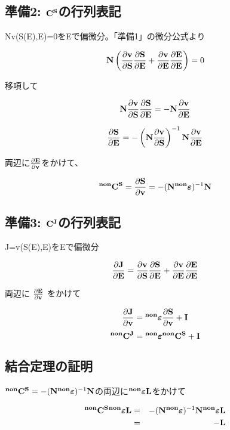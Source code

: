 \subsection{準備2: \({\bf C^S}\)の行列表記}
Nv(S(E),E)=0をEで偏微分。「準備1」の微分公式より

\[
{\bf N}\left(\frac{\partial \bf v}{\partial \bf S}\frac{\partial \bf S}{\partial \bf E}+\frac{\partial \bf v}{\partial \bf E}\frac{\partial \bf E}{\partial \bf E}\right)=0
\]

移項して

\[
{\bf N}\frac{\partial \bf v}{\partial \bf S}\frac{\partial \bf S}{\partial \bf E}=-{\bf N}\frac{\partial \bf v}{\partial \bf E}
\]

\[
\frac{\partial \bf S}{\partial \bf E}=-\left({\bf N}\frac{\partial \bf v}{\partial \bf S}\right)^{-1}{\bf N}\frac{\partial \bf v}{\partial \bf E}
\]

両辺に\(\frac{\partial \bf E}{\partial \bf v}\)をかけて、

\[
{\bf {}^{non}C^S}=\frac{\partial \bf S}{\partial \bf v}=-({\bf N {}^{non}{\boldsymbol \varepsilon}})^{-1}{\bf N}
\]

\subsection{準備3: \({\bf C^J}\)の行列表記}
J=v(S(E),E)をEで偏微分

\[\frac{\partial \bf J}{\partial \bf E}=\frac{\partial \bf v}{\partial \bf S}\frac{\partial \bf S}{\partial \bf E}+\frac{\partial \bf v}{\partial \bf E}\frac{\partial \bf E}{\partial \bf E}\]

両辺に \(\frac{\partial \bf E}{\partial \bf v}\) をかけて

\[
\frac{\partial \bf J}{\partial \bf v} = {\bf {}^{non}{\boldsymbol \varepsilon}}\frac{\partial \bf S}{\partial \bf v}+{\bf I} \]
\[{\bf {}^{non}C^J =  {}^{non}{\boldsymbol \varepsilon}{}^{non}C^S+I}
\]%

\subsection{結合定理の証明}
\({\bf {}^{non}C^S}=-({\bf N {}^{non}{\boldsymbol \varepsilon}})^{-1}{\bf N}\)の両辺に\({}^{\bf non}{\boldsymbol \varepsilon}{\bf L}\)をかけて

\begin{eqnarray*}
{\bf {}^{non}C^S{}^{non}{\boldsymbol \varepsilon} L}&=&-({\bf N {}^{non}{\boldsymbol \varepsilon}})^{-1}{\bf N{}^{non}{\boldsymbol \varepsilon} L}\\
&=& {\bf -L}
\end{eqnarray*}

